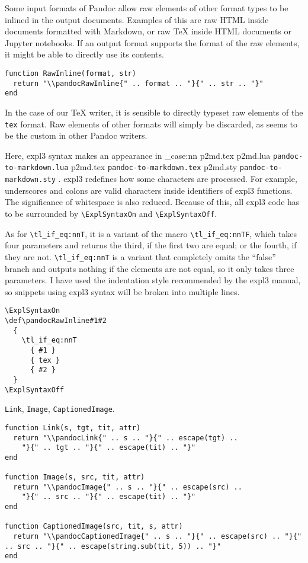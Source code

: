 \documentclass[
  digital,     %
  oneside,     %
  nosansbold,  %
  nocolorbold, %
  lof,         %
  nolot,       %
]{fithesis4}
\newcommand\macro[1]{\texttt{\textbackslash{}{#1}}}
\newcommand\file[1]
  {
    \str_case:nn
      { #1 }
      {
        { p2md.lua } { \texttt{pandoc\hyp{}to\hyp{}markdown.lua} }
        { p2md.tex } { \texttt{pandoc\hyp{}to\hyp{}markdown.tex} }
        { p2md.sty } { \texttt{pandoc\hyp{}to\hyp{}markdown.sty} }
      }
  }
\begin{document}
\noindent
Some input formats of Pandoc allow raw elements of other format types to be inlined in the output documents. Examples of this are raw HTML inside documents formatted with Markdown, or raw \TeX{} inside HTML documents or Jupyter notebooks. If an output format supports the format of the raw elements, it might be able to directly use its contents.

\noindent
\lstset{language=[5.3]Lua}
\begin{lstlisting}
function RawInline(format, str)
  return "\\pandocRawInline{" .. format .. "}{" .. str .. "}"
end
\end{lstlisting}

\noindent
In the case of our \TeX{} writer, it is sensible to directly typeset raw elements of the \texttt{tex} format. Raw elements of other formats will simply be discarded, as seems to be the custom in other Pandoc writers.

Here, expl3 syntax makes an appearance in \file{p2md.tex}. expl3 redefines how some characters are processed. For example, underscores and colons are valid characters inside identifiers of expl3 functions. The significance of whitespace is also reduced. Because of this, all expl3 code has to be surrounded by \macro{ExplSyntaxOn} and \macro{ExplSyntaxOff}.

As for \macro{tl\_if\_eq:nnT}, it is a variant of the macro \macro{tl\_if\_eq:nnTF}, which takes four parameters and returns the third, if the first two are equal; or the fourth, if they are not. \macro{tl\_if\_eq:nnT} is a variant that completely omits the ``false'' branch and outputs nothing if the elements are not equal, so it only takes three parameters. I have used the indentation style recommended by the expl3 manual, so snippets using expl3 syntax will be broken into multiple lines.

\noindent
\lstset{language=[plain]TeX}
\begin{lstlisting}
\ExplSyntaxOn
\def\pandocRawInline#1#2
  {
    \tl_if_eq:nnT
      { #1 }
      { tex }
      { #2 }
  }
\ExplSyntaxOff
\end{lstlisting}

\noindent
\texttt{Link}, \texttt{Image}, \texttt{CaptionedImage}.

\noindent
\lstset{language=[5.3]Lua}
\begin{lstlisting}
function Link(s, tgt, tit, attr)
  return "\\pandocLink{" .. s .. "}{" .. escape(tgt) ..
    "}{" .. tgt .. "}{" .. escape(tit) .. "}"
end

function Image(s, src, tit, attr)
  return "\\pandocImage{" .. s .. "}{" .. escape(src) ..
    "}{" .. src .. "}{" .. escape(tit) .. "}"
end

function CaptionedImage(src, tit, s, attr)
  return "\\pandocCaptionedImage{" .. s .. "}{" .. escape(src) .. "}{" .. src .. "}{" .. escape(string.sub(tit, 5)) .. "}"
end
\end{lstlisting}
\end{document}
